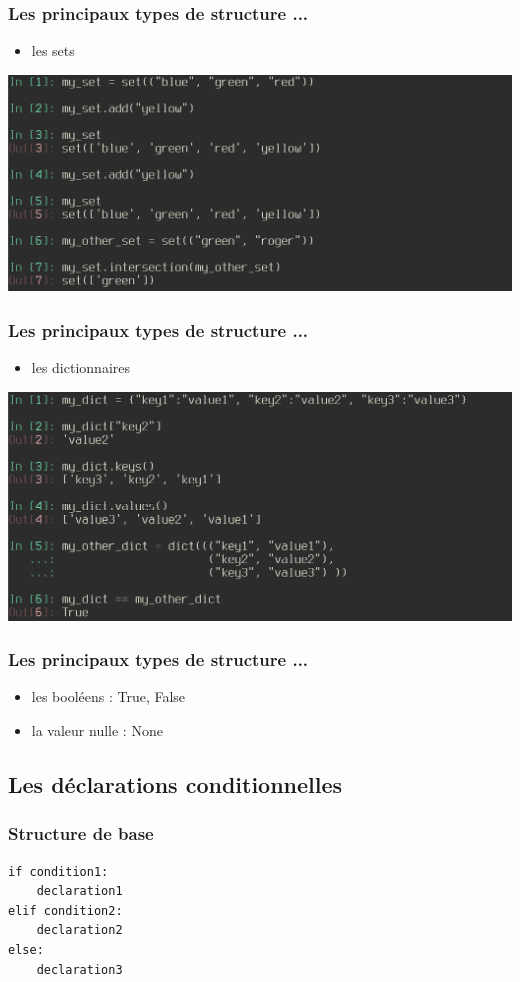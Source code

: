 \begin{frame}
  \frametitle{Les principaux types de structure ...}
    \begin{itemize}
      \item les sets
    \end{itemize}
    \includegraphics[scale=0.35]{type_set.png}
\end{frame}

\begin{frame}
  \frametitle{Les principaux types de structure ...}
    \begin{itemize}
      \item les dictionnaires
    \end{itemize}
    \includegraphics[scale=0.35]{type_dict.png}
\end{frame}

\begin{frame}
  \frametitle{Les principaux types de structure ...}
    \begin{itemize}
      \item les booléens : True, False
      \item la valeur nulle : None
    \end{itemize}
\end{frame}

\subsection{Les déclarations conditionnelles}
\begin{frame}[fragile]
  \frametitle{Structure de base}
  \begin{lstlisting}
if condition1:
    declaration1
elif condition2:
    declaration2
else:
    declaration3
  \end{lstlisting}
\end{frame}


